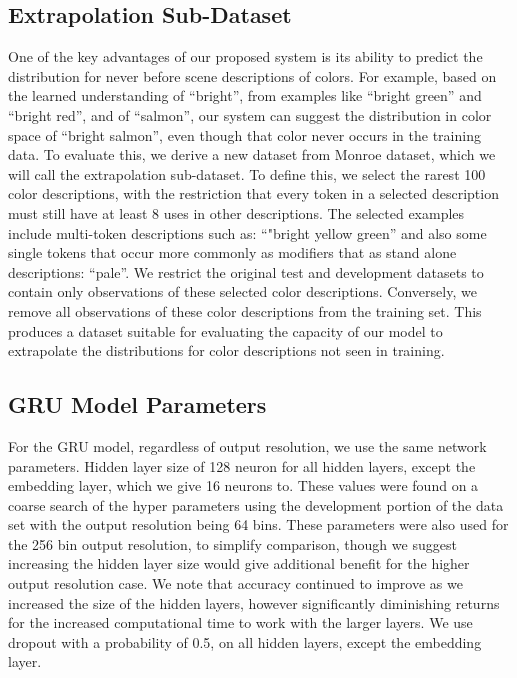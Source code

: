 \documentclass[11pt,letterpaper]{article}
\newcommand{\parencite}{\cite}
\begin{document}
\subsection{Extrapolation Sub-Dataset}
One of the key advantages of our proposed system is its ability to predict the distribution for never before scene descriptions of colors.
For example, based on the learned understanding of ``bright'', from examples like ``bright green'' and ``bright red'', and of ``salmon'', our system can suggest the distribution in color space of ``bright salmon'', even though that color never occurs in the training data.
To evaluate this, we derive a new dataset from Monroe dataset, which we will call the extrapolation sub-dataset.
To define this, we select the rarest 100 color descriptions,
with the restriction that every token in a selected description must still have at least 8 uses in other descriptions.
The selected examples include multi-token descriptions such as: ``"bright yellow green'' and also some single tokens that occur more commonly as modifiers that as stand alone descriptions: ``pale''.
We restrict the original test and development datasets to contain only observations of these selected color descriptions.
Conversely, we remove all observations of these color descriptions from the training set.
This produces a dataset suitable for evaluating the capacity of our model to extrapolate the distributions for color descriptions not seen in training.

\subsection{GRU Model Parameters}
For the GRU model, regardless of output resolution, we use the same network parameters.
Hidden layer size of 128 neuron for all hidden layers, except the embedding layer, which we give 16 neurons to.
These values were found on a coarse search of the hyper parameters using the development portion of the data set with the output resolution being 64 bins.
These parameters were also used for the 256 bin output resolution, to simplify comparison, though we suggest increasing the hidden layer size would give additional benefit for the higher output resolution case.
We note that accuracy continued to improve as  we increased the size of the hidden layers,
however significantly diminishing returns for the increased computational time to work with the larger layers.
We use dropout \parencite{srivastava2014dropout} with a probability of 0.5, on all hidden layers, except the embedding layer.
\end{document}
